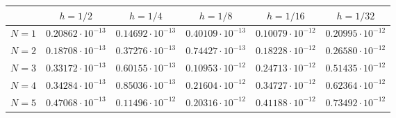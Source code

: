 \documentclass{standalone}
\begin{document}
\begin{tabular}{@{} l *{5}{c} @{}}
    \toprule
    & $h = 1/2$ & $h = 1/4$ & $h = 1/8$ & $h = 1/16$ & $h = 1/32$ \\
    \midrule
    $N = 1$ & $0.20862 \cdot 10^{-13}$ & $0.14692 \cdot 10^{-13}$ & $0.40109 \cdot 10^{-13}$ & $0.10079 \cdot 10^{-12}$ & $0.20995 \cdot 10^{-12}$ \\
    $N = 2$ & $0.18708 \cdot 10^{-13}$ & $0.37276 \cdot 10^{-13}$ & $0.74427 \cdot 10^{-13}$ & $0.18228 \cdot 10^{-12}$ & $0.26580 \cdot 10^{-12}$ \\
    $N = 3$ & $0.33172 \cdot 10^{-13}$ & $0.60155 \cdot 10^{-13}$ & $0.10953 \cdot 10^{-12}$ & $0.24713 \cdot 10^{-12}$ & $0.51435 \cdot 10^{-12}$ \\
    $N = 4$ & $0.34284 \cdot 10^{-13}$ & $0.85036 \cdot 10^{-13}$ & $0.21604 \cdot 10^{-12}$ & $0.34727 \cdot 10^{-12}$ & $0.62364 \cdot 10^{-12}$ \\
    $N = 5$ & $0.47068 \cdot 10^{-13}$ & $0.11496 \cdot 10^{-12}$ & $0.20316 \cdot 10^{-12}$ & $0.41188 \cdot 10^{-12}$ & $0.73492 \cdot 10^{-12}$ \\
    \bottomrule
\end{tabular}
\end{document}

